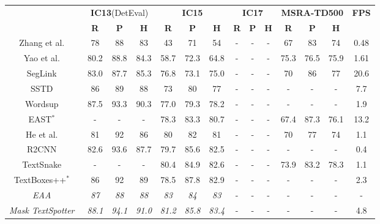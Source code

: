 \documentclass[10pt,twocolumn,letterpaper]{article}
\begin{document}
\begin{table*}[t!]
  \centering
\tabcolsep=0.2cm
  \fontsize{10}{10}\selectfont
  \renewcommand*{\arraystretch}{1.1}
  \begin{tabular}{c||c|c|c||c|c|c||c|c|c||c|c|c||c}
    \hline 
    \rule{0pt}{10pt} \multirow{2}{*}{\textbf{Method}} & \multicolumn{3}{c||}{\textbf{IC13}(DetEval)} & \multicolumn{3}{c||}{\textbf{IC15}} & \multicolumn{3}{c||}{\textbf{IC17}} & \multicolumn{3}{c||}{\textbf{MSRA-TD500}} & \multirow{2}{*}{\textbf{FPS}}\\
    \cline{2-13}
    \rule{0pt}{10pt} & \textbf{R} & \textbf{P} & \textbf{H} & \textbf{R} & \textbf{P} & \textbf{H} & \textbf{R} & \textbf{P} & \textbf{H} & \textbf{R} & \textbf{P} & \textbf{H} &\\
    \hline
    \hline

    \rule{0pt}{10pt}
    Zhang et al.~\cite{zhang2016multi} & 78 & 88 & 83 & 43 & 71 & 54 & - & - & - & 67 & 83 & 74 & 0.48 \\ 
    Yao et al.~\cite{yao2016scene} & 80.2 & 88.8 & 84.3 & 58.7 & 72.3 & 64.8 & - & - & - & 75.3 & 76.5 & 75.9 & 1.61 \\ 
    SegLink~\cite{shi2017detecting}&83.0&87.7&85.3&76.8&73.1&75.0&-&-&- & 70 & 86 & 77 & 20.6\\
    SSTD~\cite{he2017single}&86&89&88&73&80&77&-&-&- & - & - & - & 7.7 \\
    Wordsup~\cite{hu2017wordsup}&87.5&93.3&90.3&77.0&79.3&78.2&-&-&- & - & - & - & 1.9\\
    EAST$^*$~\cite{zhou2017east}&-&-&-&78.3&83.3&80.7&-&-&- & 67.4 & 87.3 & 76.1 & 13.2\\
    He et al.~\cite{he2017deep} & 81 & 92 & 86 & 80 & 82 & 81 & - & - & - & 70 & 77 & 74 & 1.1 \\
    R2CNN~\cite{jiang2017r2cnn} &82.6&93.6&87.7&79.7&85.6&82.5&-&-&- & - & - & - & 0.4\\ 
    TextSnake~\cite{long2018textsnake} & - & - & - & 80.4 & 84.9 & 82.6 & - & - & - & 73.9 & 83.2 &	78.3 & 1.1 \\
    TextBoxes++$^*$~\cite{liao2018textboxes++} & 86 & 92 & 89 & 78.5 & 87.8 & 82.9 & - & - & - & - & - & - & 2.3\\ 
\textit{EAA}~\cite{he2018end} & \textit{87} & \textit{88} & \textit{88} & \textit{83} & \textit{84} & \textit{83} & - & - & - & - & - & - & -\\ 
    \textit{Mask TextSpotter}~\cite{lyu2018mask} & \textit{88.1} & \textit{94.1} & \textit{91.0} & \textit{81.2} & \textit{85.8} & \textit{83.4} & - & -&  - & - & - & - & 4.8\\ 

\end{tabular}
\end{table*}
\end{document}
